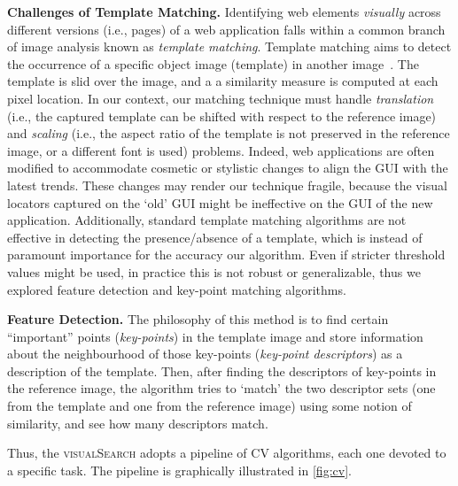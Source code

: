 \noindent
\textbf{Challenges of Template Matching.}
Identifying web elements \textit{visually} across different versions (i.e., pages) of a web application falls within a common branch of image analysis known as \textit{template matching}. 
%
Template matching aims to detect the occurrence of a specific object image (template) in another image~\cite{Brunelli:2009:TMT:1643435}. The template is slid over the image, and a a similarity measure is computed at each pixel location.
%
In our context, our matching technique must handle \textit{translation} (i.e., the captured template can be shifted with respect to the reference image) and \textit{scaling} (i.e., the aspect ratio of the template is not preserved in the reference image, or a different font is used) problems. Indeed, web applications are often modified to accommodate cosmetic or stylistic changes to align the GUI with the latest trends. These changes may render our technique fragile, because the visual locators captured on the `old' GUI might be ineffective on the GUI of the new application. Additionally, standard template matching algorithms are not effective in detecting the presence/absence of a template, which is instead of paramount importance for the accuracy our algorithm.
Even if stricter threshold values might be used, in practice this is not robust or generalizable, thus we explored feature detection and key-point matching algorithms.

\noindent
\textbf{Feature Detection.}
The philosophy of this method is to find certain ``important'' points (\textit{key-points}) in the  template image and store information about the neighbourhood of those key-points (\textit{key-point descriptors}) as a description of the template. Then, after finding the descriptors of key-points in the reference image, the algorithm tries to `match' the two descriptor sets (one from the template and one from the reference image) using some notion of similarity, and see how many descriptors match.

Thus, the \textsc{visualSearch} adopts a pipeline of CV algorithms, each one devoted to a specific task. The pipeline is graphically illustrated in \autoref{fig:cv}. 

